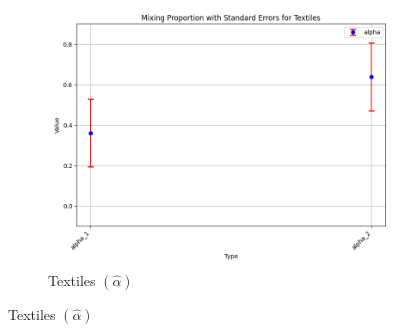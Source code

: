 \documentclass{article}
\begin{document}
\begin{figure}[ht!]
\begin{subfigure}[t]{0.32\textwidth}
    \end{subfigure}
    \begin{subfigure}[t]{0.32\textwidth}
        \centering
        \includegraphics[width=\textwidth]{figure/empirical_stat_mixture_alpha_with_error_bars_Textiles.png}
        \caption{Textiles $(\hat\alpha)$}
    \end{subfigure}


\end{figure}
\end{document}
